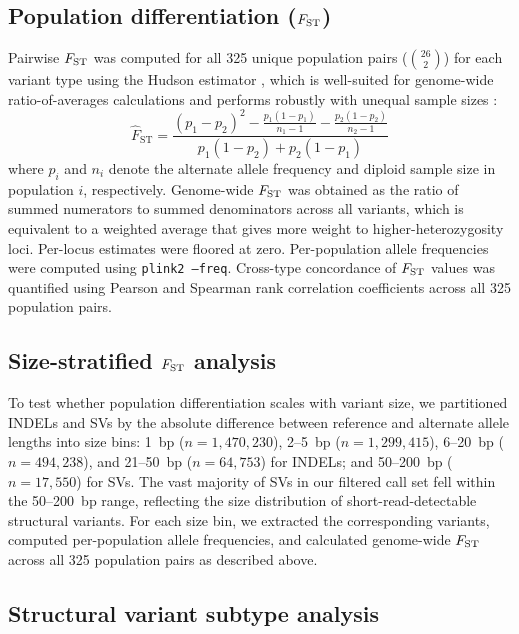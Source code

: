 \subsection*{Population differentiation ($F_\mathrm{ST}$)}

Pairwise $F_\mathrm{ST}$ was computed for all 325 unique population pairs ($\binom{26}{2}$) for each variant type using the Hudson estimator \citep{hudson1992}, which is well-suited for genome-wide ratio-of-averages calculations and performs robustly with unequal sample sizes \citep{bhatia2013}:
\begin{equation}
    \hat{F}_\mathrm{ST} = \frac{(p_1 - p_2)^2 - \frac{p_1(1-p_1)}{n_1 - 1} - \frac{p_2(1-p_2)}{n_2 - 1}}{p_1(1-p_2) + p_2(1-p_1)}
\end{equation}
where $p_i$ and $n_i$ denote the alternate allele frequency and diploid sample size in population $i$, respectively. Genome-wide $F_\mathrm{ST}$ was obtained as the ratio of summed numerators to summed denominators across all variants, which is equivalent to a weighted average that gives more weight to higher-heterozygosity loci. Per-locus estimates were floored at zero. Per-population allele frequencies were computed using \texttt{plink2 --freq}. Cross-type concordance of $F_\mathrm{ST}$ values was quantified using Pearson and Spearman rank correlation coefficients across all 325 population pairs.

\subsection*{Size-stratified $F_\mathrm{ST}$ analysis}

To test whether population differentiation scales with variant size, we partitioned INDELs and SVs by the absolute difference between reference and alternate allele lengths into size bins: 1~bp ($n = 1{,}470{,}230$), 2--5~bp ($n = 1{,}299{,}415$), 6--20~bp ($n = 494{,}238$), and 21--50~bp ($n = 64{,}753$) for INDELs; and 50--200~bp ($n = 17{,}550$) for SVs. The vast majority of SVs in our filtered call set fell within the 50--200~bp range, reflecting the size distribution of short-read-detectable structural variants. For each size bin, we extracted the corresponding variants, computed per-population allele frequencies, and calculated genome-wide $F_\mathrm{ST}$ across all 325 population pairs as described above.

\subsection*{Structural variant subtype analysis}

